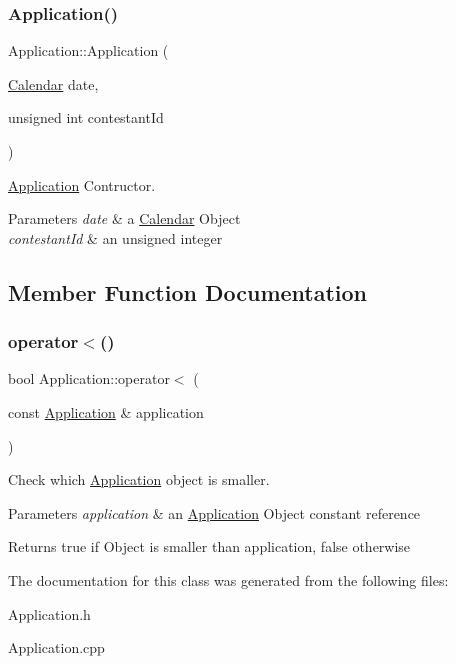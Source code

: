 \subsubsection{\texorpdfstring{Application()}{Application()}}
{\footnotesize\ttfamily Application\+::\+Application (\begin{DoxyParamCaption}\item[{\hyperlink{class_calendar}{Calendar}}]{date,  }\item[{unsigned int}]{contestant\+Id }\end{DoxyParamCaption})}



\hyperlink{class_application}{Application} Contructor. 


\begin{DoxyParams}{Parameters}
{\em date} & a \hyperlink{class_calendar}{Calendar} Object \\
\hline
{\em contestant\+Id} & an unsigned integer \\
\hline
\end{DoxyParams}


\subsection{Member Function Documentation}
\mbox{\label{class_application_a9ac9bea7fda70aa30204d1b4f7deb4ea}} 
\subsubsection{\texorpdfstring{operator$<$()}{operator<()}}
{\footnotesize\ttfamily bool Application\+::operator$<$ (\begin{DoxyParamCaption}\item[{const \hyperlink{class_application}{Application} \&}]{application }\end{DoxyParamCaption})}



Check which \hyperlink{class_application}{Application} object is smaller. 


\begin{DoxyParams}{Parameters}
{\em application} & an \hyperlink{class_application}{Application} Object constant reference \\
\hline
\end{DoxyParams}
\begin{DoxyReturn}{Returns}
true if Object is smaller than application, false otherwise 
\end{DoxyReturn}


The documentation for this class was generated from the following files\+:\begin{DoxyCompactItemize}
\item 
Application.\+h\item 
Application.\+cpp\end{DoxyCompactItemize}
